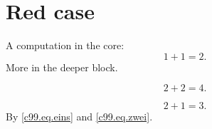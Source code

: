 \chapter{Red case}\label{c99}

A computation in the core:
\begin{equation}\label{c99.eq.eins}
  1 + 1 = 2.
\end{equation}
More in the deeper block.

\begin{vertiefung}[id=c99.v1, titel={Deeper}, wozu={Shows a second computation.},
    voraussetzung={Equation~\eqref{c99.eq.eins}.}, zurueck={It stays at two.}]
  \begin{equation}\label{c99.eq.tief}
    2 + 2 = 4.
  \end{equation}
\end{vertiefung}

\def\zwei{2}
\begin{equation}\label{c99.eq.zwei}
  2 + 1 = 3.
\end{equation}
By \eqref{c99.eq.eins} and \eqref{c99.eq.zwei}.
